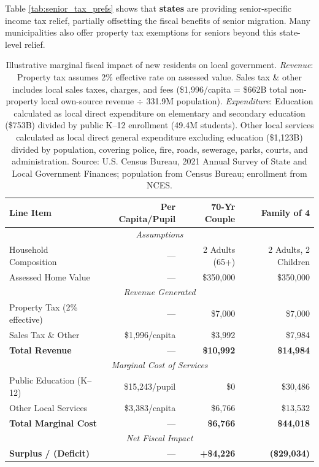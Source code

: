 \documentclass[11pt]{article}
\begin{document}
Table \ref{tab:senior_tax_prefs} shows that \textbf{states} are providing senior-specific income tax relief, partially offsetting the fiscal benefits of senior migration.  Many municipalities also offer property tax exemptions for seniors beyond this state-level relief.
\begin{table}[htbp!]
    \centering
    \small
    \begin{tabular}{|l|r|r|r|}
    \hline
    \textbf{Line Item} & \textbf{Per Capita/Pupil} & \textbf{70-Yr Couple} & \textbf{Family of 4} \\ \hline
    \multicolumn{4}{|c|}{\textit{Assumptions}} \\ \hline
    Household Composition & --- & 2 Adults (65+) & 2 Adults, 2 Children \\ \hline
    Assessed Home Value & --- & \$350,000 & \$350,000 \\ \hline
    \multicolumn{4}{|c|}{\textit{Revenue Generated}} \\ \hline
    Property Tax (2\% effective) & --- & \$7,000 & \$7,000 \\ \hline
    Sales Tax \& Other & \$1,996/capita & \$3,992 & \$7,984 \\ \hline
    \textbf{Total Revenue} & --- & \textbf{\$10,992} & \textbf{\$14,984} \\ \hline
    \multicolumn{4}{|c|}{\textit{Marginal Cost of Services}} \\ \hline
    Public Education (K--12) & \$15,243/pupil & \$0 & \$30,486 \\ \hline
    Other Local Services & \$3,383/capita & \$6,766 & \$13,532 \\ \hline
    \textbf{Total Marginal Cost} & --- & \textbf{\$6,766} & \textbf{\$44,018} \\ \hline
    \multicolumn{4}{|c|}{\textit{Net Fiscal Impact}} \\ \hline
    \textbf{Surplus / (Deficit)} & --- & \textbf{+\$4,226} & \textbf{(\$29,034)} \\ \hline
    \end{tabular}
    \caption{Illustrative marginal fiscal impact of new residents on local government. \textit{Revenue}: Property tax assumes 2\% effective rate on assessed value. Sales tax \& other includes local sales taxes, charges, and fees (\$1,996/capita = \$662B total non-property local own-source revenue $\div$ 331.9M population). \textit{Expenditure}: Education calculated as local direct expenditure on elementary and secondary education (\$753B) divided by public K--12 enrollment (49.4M students). Other local services calculated as local direct general expenditure excluding education (\$1,123B) divided by population, covering police, fire, roads, sewerage, parks, courts, and administration. Source: U.S. Census Bureau, 2021 Annual Survey of State and Local Government Finances; population from Census Bureau; enrollment from NCES.}
    \label{tab:fiscal_impact}
\end{table}
\end{document}
